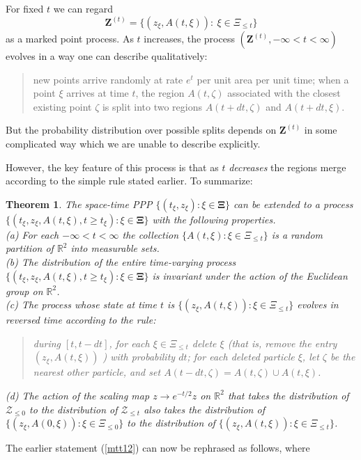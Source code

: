 \documentclass[12pt]{article}
\newtheorem{Theorem}[Lemma]{Theorem}
\newcommand{\ZZ}{\mbox{${\mathcal Z}$}}
\newcommand{\Reals}{{\mathbb{R}}}
\newcommand{\bZ}{\mathbf{Z}}
\begin{document}
 For fixed $t$ we can regard 
\[ \bZ^{(t)} = 
\{ (z_\xi, A(t,\xi)): \ \xi \in  \Xi_{\le t}  \}
\]
as a marked point process.
As $t$ increases, the process $(\bZ^{(t)}, - \infty < t < \infty)$ evolves in a way one can describe qualitatively:
\begin{quote}
new points arrive randomly at rate $e^t$ per unit area per unit time; 
when a point $\xi$ arrives at time $t$, the region $A(t,\zeta)$ associated with the closest existing point $\zeta$ is split into 
two regions $A(t +dt, \zeta)$ and $A(t +dt, \xi)$.
\end{quote}
But the probability distribution over possible splits depends on $\bZ^{(t)}$ in some complicated way which we
are unable to describe explicitly.
 
However, the key feature of this process is that as $t$ {\em decreases} the regions merge according to the simple rule stated earlier. 
To summarize:
\begin{Theorem}
\label{T:process}
The space-time PPP $\{ (t_\xi, z_\xi): \xi \in \bm{\Xi} \}$ 
can be extended to a process 
$\{ (t_\xi, z_\xi, A(t, \xi), t \ge t_\xi) : \xi \in \bm{\Xi} \}$ 
with the following properties. \\
(a) For each $- \infty < t < \infty$ the collection 
$\{ A(t,\xi) : \xi \in \Xi_{\le t} \}$ 
is a random  partition of $\Reals^2$ into measurable sets. \\
(b) The distribution  of the entire time-varying process 
$\{ (t_\xi, z_\xi, A(t, \xi), t \ge t_\xi) : \xi \in \bm{\Xi} \}$ 
is invariant under the action of the Euclidean group on $\Reals^2$. \\
(c) The process whose state at time $t$ is 
$\{ (z_\xi, A(t, \xi)) : \xi \in \Xi_{\le t} \}$ 
evolves in reversed time according to the rule:
\begin{quote}
during $[t, t - dt]$, for each $\xi \in \Xi_{\le t}$  delete $\xi$ 
(that is, remove the entry  $(z_\xi, A(t, \xi))$ )
 with probability $dt$; 
for each deleted particle $\xi$, let $\zeta$ be the nearest other particle,
and set  $A(t - dt, \zeta) = A(t, \zeta) \cup A(t,\xi)$.
\end{quote}
(d) The action of the scaling map $z \to e^{-t/2}z$ on $\Reals^2$ that takes the distribution 
of $\ZZ_{\le 0}$ to the distribution of $\ZZ_{\le t}$ also takes the distribution of 
$\{ (z_\xi, A(0, \xi)): \xi \in \Xi_{\le 0} \}$ 
to the distribution of
$\{ (z_\xi, A(t, \xi)) : \xi \in \Xi_{\le t} \}$.
\end{Theorem}
The earlier statement (\ref{mtt12}) can now be rephrased as follows, where  
\end{document}
